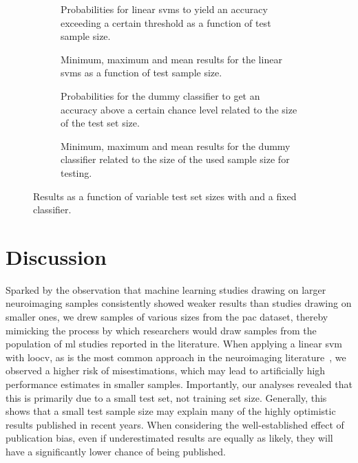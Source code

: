\documentclass[12pt,a4paper]{article}
\begin{document}
    \begin{figure}
        \captionsetup[subfigure]{justification=justified,singlelinecheck=false}
        \begin{subfigure}[t]{0.61\textwidth}
            
            \caption{Probabilities for linear \acp{svm} to yield an accuracy exceeding a certain threshold as a function of test sample size.}
        \end{subfigure}
        \hspace{3.0mm}
        \begin{subfigure}[t]{0.34\textwidth}
            
            \caption{Minimum, maximum and mean results for the linear \acp{svm} as a function of test sample size.}
        \end{subfigure}

        \vspace{3.0mm}

        \begin{subfigure}[t]{0.61\textwidth}
            
            \caption{Probabilities for the dummy classifier to get an accuracy above a certain chance level related to the size of the test set size.}
        \end{subfigure}
        \hspace{3.0mm}
        \begin{subfigure}[t]{0.34\textwidth}
            
            \caption{Minimum, maximum and mean results for the dummy classifier related to the size of the used sample size for testing.}
        \end{subfigure}
        \caption{Results as a function of variable test set sizes with and a fixed classifier.}
        \label{fig:test_sample_size_effects}
    \end{figure}


    \section{Discussion}
    Sparked by the observation that machine learning studies drawing on larger neuroimaging samples consistently showed weaker results than studies drawing on smaller ones, we drew samples of various sizes from the \ac{pac} dataset, thereby mimicking the process by which researchers would draw samples from the population of \ac{ml} studies reported in the literature. When applying a linear \ac{svm} with \ac{loocv}, as is the most common approach in the neuroimaging literature~\cite{Arbabshirani2017}, we observed a higher risk of misestimations, which may lead to artificially high performance estimates in smaller samples. Importantly, our analyses revealed that this is primarily due to a small test set, not training set size. Generally, this shows that a small test sample size may explain many of the highly optimistic results published in recent years. When considering the well-established effect of publication bias, even if underestimated results are equally as likely, they will have a significantly lower chance of being published.
\end{document}
